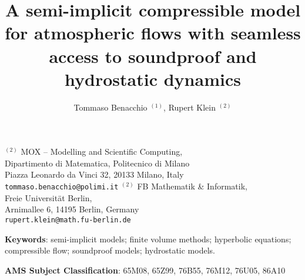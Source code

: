 \documentclass[12pt,a4paper]{article}
\theoremstyle{definition}
\begin{document}
\title{A semi-implicit compressible model for atmospheric flows with seamless access to soundproof and hydrostatic dynamics}
\author{Tommaso Benacchio $^{(1)}$, Rupert Klein $^{(2)}$}
\maketitle

\begin{center}
 
{\small
$^{(2)}$ MOX -- Modelling and Scientific Computing, \\
Dipartimento di Matematica, Politecnico di Milano \\
Piazza Leonardo da Vinci 32, 20133 Milano, Italy\\
{\tt tommaso.benacchio@polimi.it}
}
\vskip 0.5cm
{\small
$^{(2)}$ FB Mathematik \& Informatik, \\
Freie Universit\"at Berlin, \\
Arnimallee 6, 14195 Berlin, Germany\\
{\tt rupert.klein@math.fu-berlin.de}
}

\end{center}

\date{}


\noindent
{\bf Keywords}:   semi-implicit models; finite volume methods; hyperbolic equations; compressible flow;
soundproof models; hydrostatic models.  


\vspace*{0.5cm}

\noindent
{\bf AMS Subject Classification}:   65M08, 65Z99, 76B55, 76M12,  76U05, 86A10

\vspace*{0.5cm}

\pagebreak
\end{document}
